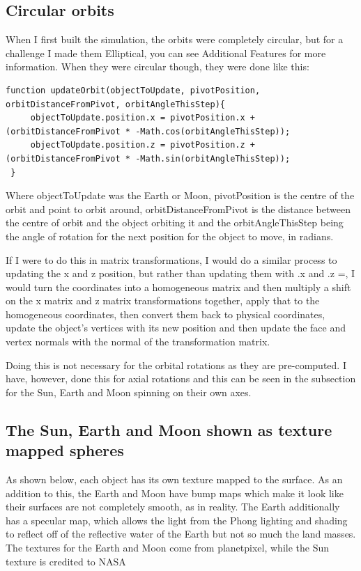 \documentclass[12pt]{article}
\begin{document}
\subsection{Circular orbits}
When I first built the simulation, the orbits were completely circular, but for a challenge I made them Elliptical, you can see Additional Features for more information. When they were circular though, they were done like this: 

\begin{lstlisting}
function updateOrbit(objectToUpdate, pivotPosition, orbitDistanceFromPivot, orbitAngleThisStep){
     objectToUpdate.position.x = pivotPosition.x + (orbitDistanceFromPivot * -Math.cos(orbitAngleThisStep));
     objectToUpdate.position.z = pivotPosition.z + (orbitDistanceFromPivot * -Math.sin(orbitAngleThisStep));
 }
 \end{lstlisting}
Where objectToUpdate was the Earth or Moon, pivotPosition is the centre of the orbit and point to orbit around, orbitDistanceFromPivot is the distance between the centre of orbit and the object orbiting it and the orbitAngleThisStep being the angle of rotation for the next position for the object to move, in radians.
 
If I were to do this in matrix transformations, I would do a similar process to updating the x and z position, but rather than updating them with .x and .z =, I would turn the coordinates into a homogeneous matrix and then multiply a shift on the x matrix and z matrix transformations together, apply that to the homogeneous coordinates, then convert them back to physical coordinates, update the object's vertices with its new position and then update the face and vertex normals with the normal of the transformation matrix. 
 
Doing this is not necessary for the orbital rotations as they are pre-computed. I have, however, done this for axial rotations and this can be seen in the subsection for the Sun, Earth and Moon spinning on their own axes.

\subsection{The Sun, Earth and Moon shown as texture mapped spheres}
As shown below, each object has its own texture mapped to the surface. As an addition to this, the Earth and Moon have bump maps which make it look like their surfaces are not completely smooth, as in reality. The Earth additionally has a specular map, which allows the light from the Phong lighting and shading to reflect off of the reflective water of the Earth but not so much the land masses. The textures for the Earth and Moon come from planetpixel\cite{earthtextures}, while the Sun texture is credited to NASA\cite{suntexture}
\end{document}
